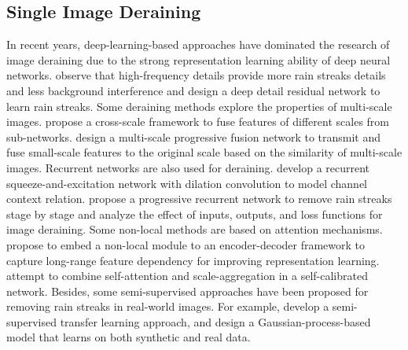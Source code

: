 \documentclass[letterpaper]{article} %
\begin{document}
\subsection{Single Image Deraining}
%


In recent years, deep-learning-based approaches have dominated the research of image deraining due to the strong representation learning ability of deep neural networks.
\citet{derain_ddn_fu} observe that high-frequency details provide more rain streaks details and less background interference and design a deep detail residual network to learn rain streaks.
Some deraining methods explore the properties of multi-scale images. \citet{mm20_wang_dcsfn} propose a cross-scale framework to fuse features of different scales from sub-networks. \citet{cvpr20_jiang_mspfn} design a multi-scale progressive fusion network to transmit and fuse small-scale features to the original scale based on the similarity of multi-scale images.
Recurrent networks are also used for deraining.
\citet{derain_rescan_li} develop a recurrent squeeze-and-excitation network with dilation convolution to model channel context relation. \citet{derain_prenet_Ren_2019_CVPR} propose a progressive recurrent network to remove rain streaks stage by stage and analyze the effect of inputs, outputs, and loss functions for image deraining. Some non-local methods are based on attention mechanisms. \citet{derain_nledn_li} propose to embed a non-local module to an encoder-decoder framework to capture long-range feature dependency for improving representation learning. \citet{mm20_wang_jdnet} attempt to combine self-attention and scale-aggregation in a self-calibrated network.
Besides, some semi-supervised approaches have been proposed for removing rain streaks in real-world images.
For example, \citet{Derain-cvpr19-semi} develop a semi-supervised transfer learning approach, and \citet{cvpr20_syn2real} design a Gaussian-process-based model that learns on both synthetic and real data.
\end{document}
